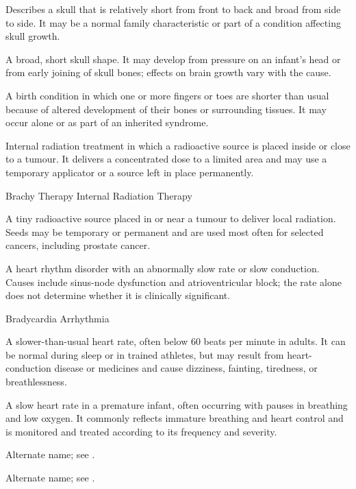  Describes a skull that is relatively short from front to back and broad from side to side. It may be a normal family characteristic or part of a condition affecting skull growth.

 A broad, short skull shape. It may develop from pressure on an infant's head or from early joining of skull bones; effects on brain growth vary with the cause.

 A birth condition in which one or more fingers or toes are shorter than usual because of altered development of their bones or surrounding tissues. It may occur alone or as part of an inherited syndrome.

 Internal radiation treatment in which a radioactive source is placed inside or close to a tumour. It delivers a concentrated dose to a limited area and may use a temporary applicator or a source left in place permanently.

\synonyms
Brachy Therapy
Internal Radiation Therapy

 A tiny radioactive source placed in or near a tumour to deliver local radiation. Seeds may be temporary or permanent and are used most often for selected cancers, including prostate cancer.

 A heart rhythm disorder with an abnormally slow rate or slow conduction. Causes include sinus-node dysfunction and atrioventricular block; the rate alone does not determine whether it is clinically significant.

\synonyms
Bradycardia Arrhythmia

 A slower-than-usual heart rate, often below 60 beats per minute in adults. It can be normal during sleep or in trained athletes, but may result from heart-conduction disease or medicines and cause dizziness, fainting, tiredness, or breathlessness.

 A slow heart rate in a premature infant, often occurring with pauses in breathing and low oxygen. It commonly reflects immature breathing and heart control and is monitored and treated according to its frequency and severity.

 Alternate name; see .

 Alternate name; see .

